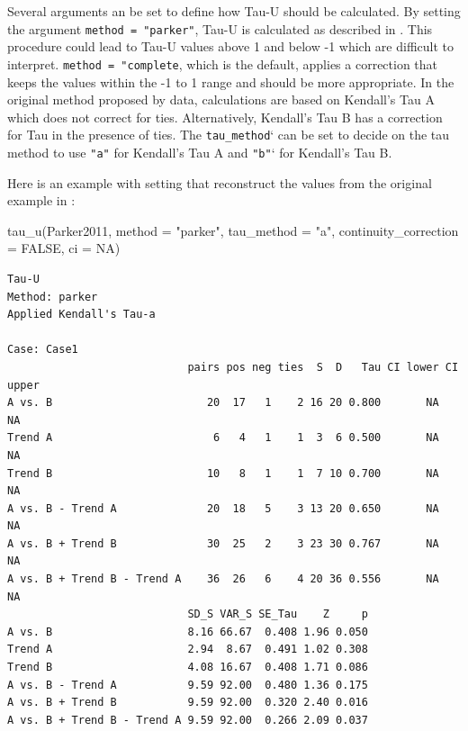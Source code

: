 \documentclass[
]{book}
\newenvironment{Shaded}{\begin{snugshade}}{\end{snugshade}}
\newcommand{\AttributeTok}[1]{\textcolor[rgb]{0.77,0.63,0.00}{#1}}
\newcommand{\ConstantTok}[1]{\textcolor[rgb]{0.00,0.00,0.00}{#1}}
\newcommand{\FunctionTok}[1]{\textcolor[rgb]{0.00,0.00,0.00}{#1}}
\newcommand{\NormalTok}[1]{#1}
\newcommand{\StringTok}[1]{\textcolor[rgb]{0.31,0.60,0.02}{#1}}
\begin{document}
Several arguments an be set to define how Tau-U should be calculated. By setting the argument \texttt{method\ =\ "parker"}, Tau-U is calculated as described in \citet{parker_combining_2011}. This procedure could lead to Tau-U values above 1 and below -1 which are difficult to interpret. \texttt{method\ =\ "complete}, which is the default, applies a correction that keeps the values within the -1 to 1 range and should be more appropriate. In the original method proposed by \citet{parker_combining_2011} data, calculations are based on Kendall's Tau A which does not correct for ties. Alternatively, Kendall's Tau B has a correction for Tau in the presence of ties. The \texttt{tau\_method}` can be set to decide on the tau method to use \texttt{"a"} for Kendall's Tau A and \texttt{"b"}` for Kendall's Tau B.

Here is an example with setting that reconstruct the values from the original example in \citet{parker2011} :

\begin{Shaded}
\begin{Highlighting}[]
\FunctionTok{tau\_u}\NormalTok{(Parker2011, }\AttributeTok{method =} \StringTok{"parker"}\NormalTok{, }\AttributeTok{tau\_method =} \StringTok{"a"}\NormalTok{, }\AttributeTok{continuity\_correction =} \ConstantTok{FALSE}\NormalTok{, }\AttributeTok{ci =} \ConstantTok{NA}\NormalTok{)}
\end{Highlighting}
\end{Shaded}

\begin{verbatim}
Tau-U
Method: parker 
Applied Kendall's Tau-a

Case: Case1 
                            pairs pos neg ties  S  D   Tau CI lower CI upper
A vs. B                        20  17   1    2 16 20 0.800       NA       NA
Trend A                         6   4   1    1  3  6 0.500       NA       NA
Trend B                        10   8   1    1  7 10 0.700       NA       NA
A vs. B - Trend A              20  18   5    3 13 20 0.650       NA       NA
A vs. B + Trend B              30  25   2    3 23 30 0.767       NA       NA
A vs. B + Trend B - Trend A    36  26   6    4 20 36 0.556       NA       NA
                            SD_S VAR_S SE_Tau    Z     p
A vs. B                     8.16 66.67  0.408 1.96 0.050
Trend A                     2.94  8.67  0.491 1.02 0.308
Trend B                     4.08 16.67  0.408 1.71 0.086
A vs. B - Trend A           9.59 92.00  0.480 1.36 0.175
A vs. B + Trend B           9.59 92.00  0.320 2.40 0.016
A vs. B + Trend B - Trend A 9.59 92.00  0.266 2.09 0.037
\end{verbatim}
\end{document}
